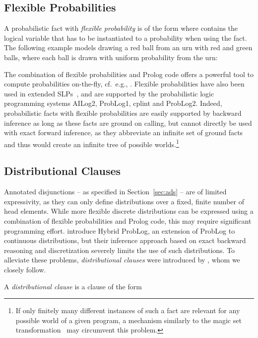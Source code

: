 \documentclass[a4paper]{article}
\begin{document}
\subsection{Flexible Probabilities}
A probabilistic fact with \emph{flexible probability} is of the form
 where  contains the logical variable  that has to be instantiated to a probability when using the fact. The following example models drawing a red ball from an urn with  red and  green balls, where each ball is drawn with uniform probability from the urn:

The combination of flexible probabilities and Prolog code offers a
powerful tool to compute probabilities on-the-fly, cf.~e.g., \citep{Poole08}. 
Flexible probabilities have also been used in extended
SLPs~\citep{Angelopoulos04}, and are supported by the probabilistic
logic programming systems AILog2, ProbLog1, cplint and ProbLog2. 
Indeed, probabilistic facts with flexible probabilities are easily
supported by backward inference as long as
these facts are ground on calling, but cannot directly be used
with exact forward inference, as they abbreviate an infinite set of ground
facts and thus would create an infinite tree of possible worlds.\footnote{If
only finitely many different instances of such a fact are relevant for
any possible world of a given program, a mechanism similarly to the magic set
transformation~\citep{bancilhon:pods86} may circumvent this problem.}



\subsection{Distributional Clauses}
\label{sec:dc}

Annotated disjunctions -- as specified in Section~\ref{sec:ads} -- are
of limited expressivity, as they can only define distributions over a
fixed, finite number of head elements. 
While more flexible discrete distributions can be
expressed using a combination of flexible probabilities and Prolog
code, this may require significant programming
effort. \cite{gutmann:ilp10} introduce Hybrid ProbLog, an
extension of ProbLog to continuous distributions, but their
inference approach based on exact backward reasoning and
discretization severely limits  the use of such distributions. 
 To alleviate these problems, \emph{distributional clauses} were introduced by \cite{Gutmann11}, whom we closely follow.

A \emph{distributional clause} is a clause of the form 
\end{document}
